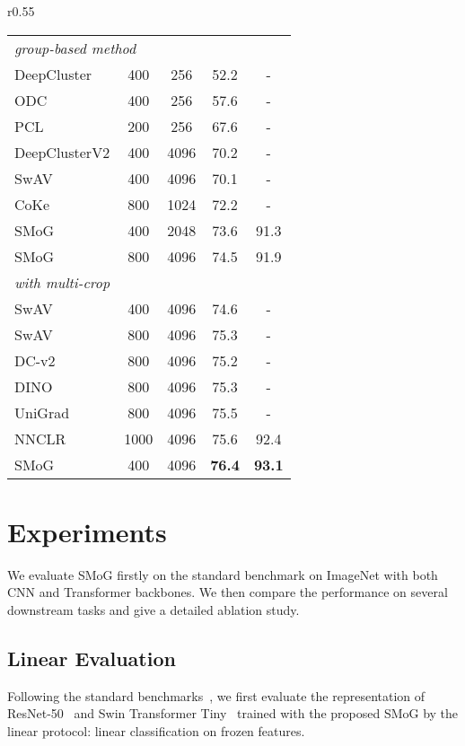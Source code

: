 \documentclass[runningheads]{style/llncs}
\begin{document}
\begin{wraptable}[29]{r}{0.55\linewidth}
{\begin{tabular}{l|cccc}
			\hline
			\multicolumn{3}{l}{\textit{group-based method}}\\
			DeepCluster & 400 & 256 & 52.2 & -\\
			ODC~\cite{ODC} & 400 & 256 & 57.6 & -\\
			PCL~\cite{pcl} & 200 & 256 & 67.6 & -\\
			DeepClusterV2 & 400 & 4096 & 70.2 & -\\
			SwAV & 400 & 4096 & 70.1 & -\\
			CoKe~\cite{coke} & 800 & 1024 & 72.2 & -\\
			\rowcolor[gray]{0.95} SMoG & 400 & 2048 & 73.6 & 91.3\\
			\rowcolor[gray]{0.95} SMoG & 800 & 4096 & 74.5 & 91.9\\
			\hline
			\multicolumn{3}{l}{\textit{with multi-crop}}\\
			SwAV & 400 & 4096 & 74.6 & -\\
			SwAV & 800 & 4096 & 75.3 & -\\
			DC-v2 & 800 & 4096 & 75.2 & - \\
			DINO ~\cite{dino} & 800 & 4096 & 75.3 & - \\
			UniGrad ~\cite{unigrad} & 800 & 4096 & 75.5 & - \\
			NNCLR ~\cite{nnclr} & 1000 & 4096 & 75.6 & 92.4\\ 
			\rowcolor[gray]{0.95} SMoG & 400 & 4096 & \textbf{76.4} & \textbf{93.1}\\
	\end{tabular}}
	\label{tab:res50_res}
\end{wraptable}

\section{Experiments}
We evaluate SMoG firstly on the standard benchmark on ImageNet with both CNN and Transformer backbones. We then compare the performance on several downstream tasks and give a detailed ablation study.

\subsection{Linear Evaluation}
Following the standard benchmarks~\cite{moco,simclr,byol,swav,dino,mocov3,moby}, we first evaluate the representation of ResNet-50~\cite{resnet} and Swin Transformer Tiny~\cite{SwinT} trained with the proposed SMoG by the linear protocol: linear classification on frozen features.
\end{document}
